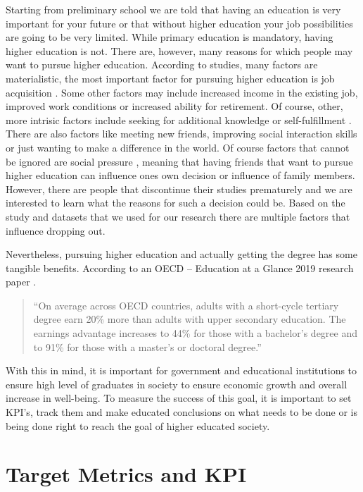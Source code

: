 \documentclass[
  letterpaper,
  DIV=11,
  numbers=noendperiod]{scrartcl}
\begin{document}
Starting from preliminary school we are told that having an education is
very important for your future or that without higher education your job
possibilities are going to be very limited. While primary education is
mandatory, having higher education is not. There are, however, many
reasons for which people may want to pursue higher education. According
to studies, many factors are materialistic, the most important factor
for pursuing higher education is job acquisition
\autocite{knutsen_motivation_2011}. Some other factors may include
increased income in the existing job, improved work conditions or
increased ability for retirement. Of course, other, more intrisic
factors include seeking for additional knowledge or self-fulfillment
\autocite{cortes_factors_2023}. There are also factors like meeting new
friends, improving social interaction skills or just wanting to make a
difference in the world. Of course factors that cannot be ignored are
social pressure \autocite{temple_factors_2009}, meaning that having
friends that want to pursue higher education can influence ones own
decision or influence of family members. However, there are people that
discontinue their studies prematurely and we are interested to learn
what the reasons for such a decision could be. Based on the study and
datasets that we used for our research there are multiple factors that
influence dropping out.

Nevertheless, pursuing higher education and actually getting the degree
has some tangible benefits. According to an OECD -- Education at a
Glance 2019 research paper \autocite{oecd_education_2019}.

\begin{quote}
\enquote{On average across OECD countries, adults with a short-cycle
tertiary degree earn 20\% more than adults with upper secondary
education. The earnings advantage increases to 44\% for those with a
bachelor's degree and to 91\% for those with a master's or doctoral
degree.}
\end{quote}

With this in mind, it is important for government and educational
institutions to ensure high level of graduates in society to ensure
economic growth and overall increase in well-being. To measure the
success of this goal, it is important to set KPI's, track them and make
educated conclusions on what needs to be done or is being done right to
reach the goal of higher educated society.

\hypertarget{sec-kpi}{%
\section{Target Metrics and KPI}\label{sec-kpi}}
\end{document}
